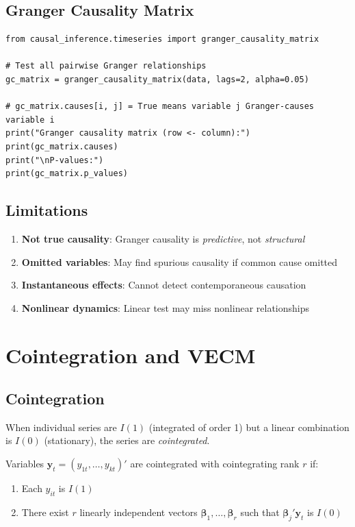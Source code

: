 \subsection{Granger Causality Matrix}

\begin{verbatim}
from causal_inference.timeseries import granger_causality_matrix

# Test all pairwise Granger relationships
gc_matrix = granger_causality_matrix(data, lags=2, alpha=0.05)

# gc_matrix.causes[i, j] = True means variable j Granger-causes variable i
print("Granger causality matrix (row <- column):")
print(gc_matrix.causes)
print("\nP-values:")
print(gc_matrix.p_values)
\end{verbatim}

\subsection{Limitations}

\begin{enumerate}
    \item \textbf{Not true causality}: Granger causality is \textit{predictive}, not \textit{structural}
    \item \textbf{Omitted variables}: May find spurious causality if common cause omitted
    \item \textbf{Instantaneous effects}: Cannot detect contemporaneous causation
    \item \textbf{Nonlinear dynamics}: Linear test may miss nonlinear relationships
\end{enumerate}


\section{Cointegration and VECM}

\subsection{Cointegration}

When individual series are $I(1)$ (integrated of order 1) but a linear combination is $I(0)$ (stationary), the series are \textit{cointegrated}.

\begin{definition}[Cointegration]
Variables $\mathbf{y}_t = (y_{1t}, \ldots, y_{kt})'$ are cointegrated with cointegrating rank $r$ if:
\begin{enumerate}
    \item Each $y_{it}$ is $I(1)$
    \item There exist $r$ linearly independent vectors $\boldsymbol{\beta}_1, \ldots, \boldsymbol{\beta}_r$ such that $\boldsymbol{\beta}_j' \mathbf{y}_t$ is $I(0)$
\end{enumerate}
\end{definition}

